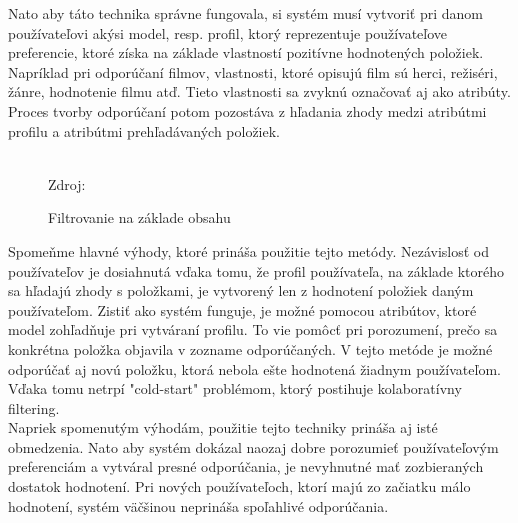 Nato aby táto technika správne fungovala, si systém musí vytvoriť pri danom používateľovi akýsi model, resp. profil, ktorý reprezentuje používateľove preferencie, ktoré získa na základe vlastností pozitívne hodnotených položiek. Napríklad pri odporúčaní filmov, vlastnosti, ktoré opisujú film sú herci, režiséri, žánre, hodnotenie filmu atď. Tieto vlastnosti sa zvyknú označovať aj ako atribúty. Proces tvorby odporúčaní potom pozostáva z hľadania zhody medzi atribútmi profilu a atribútmi prehľadávaných položiek. \cite{rs1} \\\\
\begin{figure}[!htbp]
  \centering  
  \def\stackalignment{c}
           {\scriptsize%
            Zdroj: \cite{rs3}}
  \caption{Filtrovanie na základe obsahu}
  
  \label{contentFiltering}
\end{figure}

Spomeňme hlavné výhody, ktoré prináša použitie tejto metódy. Nezávislosť od používateľov je dosiahnutá vďaka tomu, že profil používateľa, na základe ktorého sa hľadajú zhody s položkami, je vytvorený len z hodnotení položiek daným používateľom. Zistiť ako systém funguje, je možné pomocou atribútov, ktoré model zohľadňuje pri vytváraní profilu. To vie pomôcť pri porozumení, prečo sa konkrétna položka objavila v zozname odporúčaných. V tejto metóde je možné odporúčať aj novú položku, ktorá nebola ešte hodnotená žiadnym používateľom. Vďaka tomu netrpí "cold-start" problémom, ktorý postihuje kolaboratívny filtering. \cite{rs1} \\

Napriek spomenutým výhodám, použitie tejto techniky prináša aj isté obmedzenia. Nato aby systém dokázal naozaj dobre porozumieť používateľovým preferenciám a vytváral presné odporúčania, je nevyhnutné mať zozbieraných dostatok hodnotení. Pri nových používateľoch, ktorí majú zo začiatku málo hodnotení, systém väčšinou neprináša spoľahlivé odporúčania. 


